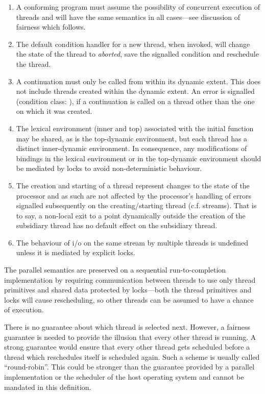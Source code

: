 \begin{optDefinition}
\begin{enumerate}
    \item A conforming program must assume the possibility of concurrent
    execution of threads and will have the same semantics in all cases---see
    discussion of fairness which follows.

    \item The default condition handler for a new thread, when invoked, will
    change the state of the thread to {\it aborted}, save the signalled
    condition and reschedule the thread.

    \item A continuation must only be called from within its dynamic extent.
    This does not include threads created within the dynamic extent.  An error
    is signalled (condition class: 
    ), if a continuation is called on
    a thread other than the one on which it was created.

    \item The lexical environment (inner and top) associated with the initial
    function may be shared, as is the top-dynamic environment, but each thread
    has a distinct inner-dynamic environment.  In consequence, any modifications
    of bindings in the lexical environment or in the top-dynamic environment
    should be mediated by locks to avoid non-deterministic behaviour.

    \item The creation and starting of a thread represent changes to the state
    of the processor and as such are not affected by the processor's handling of
    errors signalled subsequently on the creating/starting thread
    (c.f. streams).  That is to say, a non-local exit to a point dynamically
    outside the creation of the subsidiary thread has no default effect on the
    subsidiary thread.

    \item The behaviour of i/o on the same stream by multiple threads is
    undefined unless it is mediated by explicit locks.
\end{enumerate}

The parallel semantics are preserved on a sequential run-to-completion
implementation by requiring communication between threads to use only
thread primitives and shared data protected by locks---both the
thread primitives and locks will cause rescheduling, so other
threads can be assumed to have a chance of execution.

There is no guarantee about which thread is selected next.  However, a
fairness guarantee is needed to provide the illusion that every other
thread is running.  A strong guarantee would ensure that every other
thread gets scheduled before a thread which reschedules itself is
scheduled again.  Such a scheme is usually called ``round-robin''.
This could be stronger than the guarantee provided by a parallel
implementation or the scheduler of the host operating system and
cannot be mandated in this definition.


\end{optDefinition}
